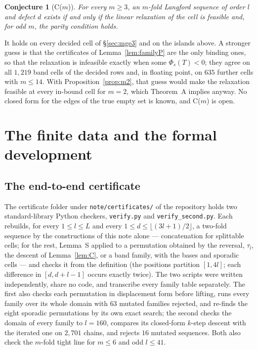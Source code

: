 \documentclass[11pt]{amsart}
\theoremstyle{plain}
\newtheorem{conjecture}[theorem]{Conjecture}
\theoremstyle{definition}
\theoremstyle{remark}
\begin{document}
\begin{conjecture}[C($m$)]\label{conj:C}
For every $m \ge 3$, an $m$-fold Langford sequence of order $l$ and defect $d$ exists if
and only if the linear relaxation of the cell is feasible and, for odd $m$, the parity
condition holds.
\end{conjecture}

It holds on every decided cell of \S\ref{sec:mge3} and on the islands above. A stronger
guess is that the certificates of Lemma~\ref{lem:familyP} are the only binding ones, so
that the relaxation is infeasible exactly when some $\Phi_s(T) < 0$; they agree on all
$1{,}219$ band cells of the decided rows and, in floating point, on $635$ further cells
with $m \le 14$. With Proposition~\ref{prop:m2}, that guess would make the relaxation
feasible at every in-bound cell for $m = 2$, which Theorem~A implies anyway. No closed
form for the edges of the true empty set is known, and C($m$) is open.

\section{The finite data and the formal development}\label{sec:finite}

\subsection*{The end-to-end certificate}
The certificate folder under \texttt{note/certificates/} of the repository \cite{l2lean}
holds two standard-library Python checkers, \texttt{verify.py} and
\texttt{verify\_second.py}. Each rebuilds, for every $1 \le l \le L$ and every
$1 \le d \le \lfloor(3l+1)/2\rfloor$, a two-fold sequence by the constructions of this
note alone --- concatenation for splittable cells; for the rest, Lemma~S applied to a
permutation obtained by the reversal, $\tau_l$, the descent of Lemma~\ref{lem:C}, or a
band family, with the bases and sporadic cells --- and checks it from the definition
(the positions partition $[1,4l]$; each difference in $[d,d+l-1]$ occurs exactly
twice). The two scripts were written independently, share no code, and transcribe every
family table separately. The first also checks each permutation in displacement form
before lifting, runs every family over its whole domain with $63$ mutated families
rejected, and re-finds the eight sporadic permutations by its own exact search; the
second checks the domain of every family to $l = 160$, compares its closed-form $k$-step
descent with the iterated one on $2{,}701$ chains, and rejects $16$ mutated sequences.
Both also check the $m$-fold tight line for $m \le 6$ and odd $l \le 41$.
\end{document}
